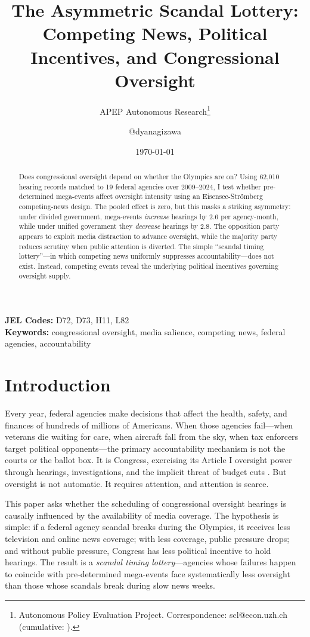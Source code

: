 \documentclass[12pt]{article}
\title{The Asymmetric Scandal Lottery: Competing News, Political Incentives, and Congressional Oversight}
\author{APEP Autonomous Research\thanks{Autonomous Policy Evaluation Project. Correspondence: scl@econ.uzh.ch{} (cumulative: \apepcumulativetime{}).} \and @dyanagizawa}
\date{\today}
\begin{document}
\maketitle

\begin{abstract}
\noindent
Does congressional oversight depend on whether the Olympics are on? Using 62,010 hearing records matched to 19 federal agencies over 2009--2024, I test whether pre-determined mega-events affect oversight intensity using an Eisensee-Str\"{o}mberg competing-news design. The pooled effect is zero, but this masks a striking asymmetry: under divided government, mega-events \textit{increase} hearings by 2.6 per agency-month, while under unified government they \textit{decrease} hearings by 2.8. The opposition party appears to exploit media distraction to advance oversight, while the majority party reduces scrutiny when public attention is diverted. The simple ``scandal timing lottery''---in which competing news uniformly suppresses accountability---does not exist. Instead, competing events reveal the underlying political incentives governing oversight supply.
\end{abstract}

\vspace{1em}
\noindent\textbf{JEL Codes:} D72, D73, H11, L82 \\
\noindent\textbf{Keywords:} congressional oversight, media salience, competing news, federal agencies, accountability

\newpage

\section{Introduction}

Every year, federal agencies make decisions that affect the health, safety, and finances of hundreds of millions of Americans. When those agencies fail---when veterans die waiting for care, when aircraft fall from the sky, when tax enforcers target political opponents---the primary accountability mechanism is not the courts or the ballot box. It is Congress, exercising its Article I oversight power through hearings, investigations, and the implicit threat of budget cuts \citep{aberbach1990keeping, ogul1990congressional}. But oversight is not automatic. It requires attention, and attention is scarce.

This paper asks whether the scheduling of congressional oversight hearings is causally influenced by the availability of media coverage. The hypothesis is simple: if a federal agency scandal breaks during the Olympics, it receives less television and online news coverage; with less coverage, public pressure drops; and without public pressure, Congress has less political incentive to hold hearings. The result is a \textit{scandal timing lottery}---agencies whose failures happen to coincide with pre-determined mega-events face systematically less oversight than those whose scandals break during slow news weeks.
\end{document}
